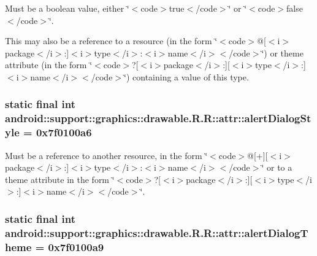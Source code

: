 Must be a boolean value, either \char`\"{}$<$code$>$true$<$/code$>$\char`\"{} or \char`\"{}$<$code$>$false$<$/code$>$\char`\"{}. 

This may also be a reference to a resource (in the form \char`\"{}$<$code$>$@\mbox{[}$<$i$>$package$<$/i$>$:\mbox{]}$<$i$>$type$<$/i$>$:$<$i$>$name$<$/i$>$$<$/code$>$\char`\"{}) or theme attribute (in the form \char`\"{}$<$code$>$?\mbox{[}$<$i$>$package$<$/i$>$:\mbox{]}\mbox{[}$<$i$>$type$<$/i$>$:\mbox{]}$<$i$>$name$<$/i$>$$<$/code$>$\char`\"{}) containing a value of this type. \hypertarget{classandroid_1_1support_1_1graphics_1_1drawable_1_1_r_1_1attr_cf0fb3716020c344a4befc2d5527e377}{
\subsubsection[{alertDialogStyle}]{\setlength{\rightskip}{0pt plus 5cm}static final int android::support::graphics::drawable.R.R::attr::alertDialogStyle = 0x7f0100a6}}
\label{classandroid_1_1support_1_1graphics_1_1drawable_1_1_r_1_1attr_cf0fb3716020c344a4befc2d5527e377}


Must be a reference to another resource, in the form \char`\"{}$<$code$>$@\mbox{[}+\mbox{]}\mbox{[}$<$i$>$package$<$/i$>$:\mbox{]}$<$i$>$type$<$/i$>$:$<$i$>$name$<$/i$>$$<$/code$>$\char`\"{} or to a theme attribute in the form \char`\"{}$<$code$>$?\mbox{[}$<$i$>$package$<$/i$>$:\mbox{]}\mbox{[}$<$i$>$type$<$/i$>$:\mbox{]}$<$i$>$name$<$/i$>$$<$/code$>$\char`\"{}. \hypertarget{classandroid_1_1support_1_1graphics_1_1drawable_1_1_r_1_1attr_9e2835f4d9a3b53502da6e8d5edefb2a}{
\subsubsection[{alertDialogTheme}]{\setlength{\rightskip}{0pt plus 5cm}static final int android::support::graphics::drawable.R.R::attr::alertDialogTheme = 0x7f0100a9}}
\label{classandroid_1_1support_1_1graphics_1_1drawable_1_1_r_1_1attr_9e2835f4d9a3b53502da6e8d5edefb2a}


